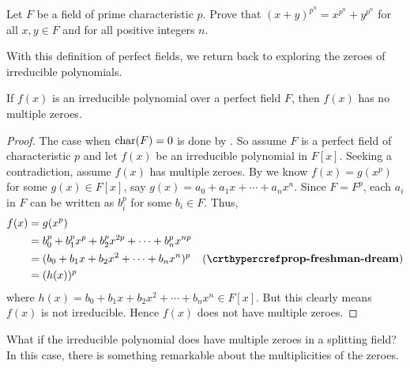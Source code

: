 \begin{exercise}
    Let $F$ be a field of prime characteristic $p$. Prove that $(x + y)^{p^n} = x^{p^n} + y^{p^n}$ for all $x,y \in F$ and for all positive integers $n$.
\end{exercise}

With this definition of perfect fields, we return back to exploring the zeroes of irreducible polynomials.

\begin{theorem}\label{thrm-irreducible-polynomial-over-perfect-field-has-no-multiple-zeroes}
    If $f(x)$ is an irreducible polynomial over a perfect field $F$, then $f(x)$ has no multiple zeroes.
\end{theorem}
\begin{proof}
    The case when $\mathrm{char}(F) = 0$ is done by . So assume $F$ is a perfect field of characteristic $p$ and let $f(x)$ be an irreducible polynomial in $F[x]$. Seeking a contradiction, assume $f(x)$ has multiple zeroes. By  we know $f(x) = g(x^p)$ for some $g(x) \in F[x]$, say $g(x) = a_0 + a_1x + \cdots + a_nx^n$. Since $F = F^p$, each $a_i$ in $F$ can be written as $b_i^p$ for some $b_i \in F$. Thus,
    \begin{align*}
        f(x) &= g(x^p)\\
        &= b_0^p + b_1^px^p + b_2^px^{2p} + \cdots + b_n^px^{np}\\
        &= (b_0 + b_1x + b_2x^2 + \cdots + b_nx^n)^p & (\myref{prop-freshman-dream})\\
        &= (h(x))^p
    \end{align*}
    where $h(x) = b_0 + b_1x + b_2x^2 + \cdots + b_nx^n \in F[x]$. But this clearly means $f(x)$ is not irreducible. Hence $f(x)$ does not have multiple zeroes.
\end{proof}

What if the irreducible polynomial does have multiple zeroes in a splitting field? In this case, there is something remarkable about the multiplicities of the zeroes.

